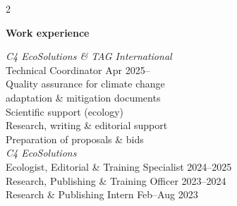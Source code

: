 \documentclass[10pt]{article}
\begin{document}
\begin{multicols}{2} %
  
\textbf{\large Work experience} %


\textit{C4 EcoSolutions \& TAG International} \\
\hspace{2em} Technical Coordinator \hfill {\small Apr 2025--\hspace*{2.25em}} \\
\hspace{3em} {\small Quality assurance for climate change} \\
\hspace{4em} {\small adaptation \& mitigation documents} \\
\hspace{3em} {\small Scientific support (ecology)} \\
\hspace{3em} {\small Research, writing \& editorial support} \\
\hspace{3em} {\small Preparation of proposals \& bids} \\

\textit{C4 EcoSolutions} \\
\hspace{2em} Ecologist, Editorial \& Training Specialist \hfill {\small 2024--2025} \\
\hspace{2em} Research, Publishing \& Training Officer \hfill {\small 2023--2024} \\
\hspace{2em} Research \& Publishing Intern \hfill {\small Feb--Aug 2023}


\end{multicols}
\end{document}
